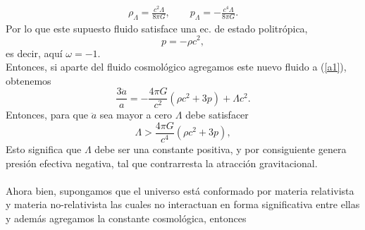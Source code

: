 \begin{eqnarray}
\rho_{\Lambda}=\frac{c^2\Lambda}{8\pi G},    \qquad
p_{\Lambda}=-\frac{c^4\Lambda}{8\pi G}.
\end{eqnarray}
Por lo que este supuesto fluido satisface una ec. de estado politrópica,
\begin{equation}
p=-\rho c^2,
\end{equation}
es decir, aquí  $\omega=-1$.\\
Entonces, si aparte del fluido cosmológico agregamos este nuevo fluido a (\ref{a1}), obtenemos
\begin{equation}
\frac{3\ddot a}{a}=-\frac{4\pi G}{c^2}(\rho c^2+3p)+\Lambda c^2. 
\end{equation}
Entonces, para que $\ddot a$ sea mayor a cero $\Lambda$ debe satisfacer
\begin{equation}
\Lambda > \frac{4\pi G}{c^4}(\rho c^2 + 3p),
\end{equation}
Esto significa que $\Lambda$ debe ser una constante positiva, y por consiguiente genera presión efectiva negativa, tal que
contrarresta la atracción gravitacional.\\ \\
Ahora bien, supongamos que el universo está conformado por materia relativista y materia no-relativista las cuales no interactuan en forma significativa entre ellas  y además agregamos la constante cosmológica, entonces

